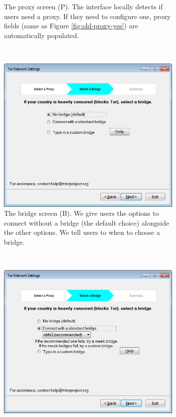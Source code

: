 \documentclass[USenglish,oneside,twocolumn]{article}
\begin{document}
\begin{figure}
\begin{subfigure}[b]{0.30\textwidth}
	\centering\captionsetup{width=1.5\linewidth}%
	\caption{The proxy screen (P). The interface locally detects if users need a proxy. If they need to configure one, proxy fields (same as Figure \ref{fig:old-proxy-yes}) are automatically populated.}
	\label{fig:new-proxy}
\end{subfigure}
~~~~~~~~~~
\begin{subfigure}[b]{0.30\textwidth}
	\includegraphics[width=\textwidth]{screenshots/NEW-bridgeSettings.png}
	\centering\captionsetup{width=1.5\linewidth}%
	\caption{The bridge screen (B). We give users the options to connect  without a bridge (the default choice) alongside the other options. We tell users to when to choose a bridge. }
	\label{fig:new-nobridge}
\end{subfigure}
~~~~~~~~~~~~~~~~~~~~~~~~~
\begin{subfigure}[b]{0.30\textwidth}
	\includegraphics[width=\textwidth]{screenshots/NEW-bridgeSettings-default.png}

\end{subfigure}
\end{figure}
\end{document}
